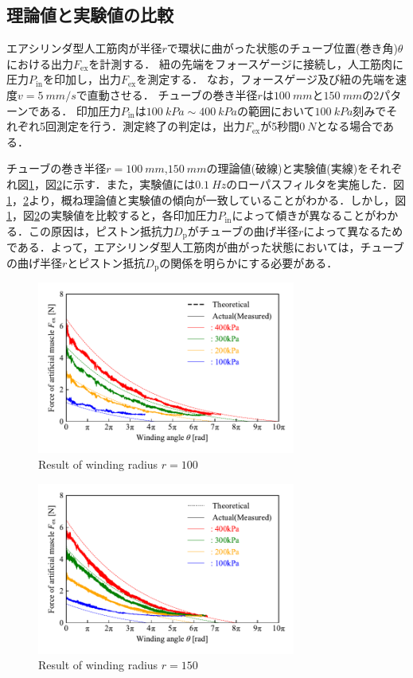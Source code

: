 \subsection{理論値と実験値の比較}%
エアシリンダ型人工筋肉が半径$r$で環状に曲がった状態のチューブ位置(巻き角)$\theta$における出力$F_\mathrm{ex}$を計測する．
紐の先端をフォースゲージに接続し，人工筋肉に圧力$P_\mathrm{in}$を印加し，出力$F_\mathrm{ex}$を測定する．
なお，フォースゲージ及び紐の先端を速度$v=\SI{5}{mm/s}$で直動させる．
チューブの巻き半径$r$は$\SI{100}{mm}$と$\SI{150}{mm}$の2パターンである．
印加圧力$P_\mathrm{in}$は$\SI{100}{kPa} \sim \SI{400}{kPa}$の範囲において$\SI{100}{kPa}$刻みでそれぞれ5回測定を行う．測定終了の判定は，出力$F_\mathrm{ex}$が5秒間$\SI{0}{N}$となる場合である．
\par
チューブの巻き半径$r=\SI{100}{mm}$,$\SI{150}{mm}$の理論値(破線)と実験値(実線)をそれぞれ図\ref{r=100mm}，図\ref{r=150mm}に示す．また，実験値には$\SI{0.1}{Hz}$のローパスフィルタを実施した．図\ref{r=100mm}，\ref{r=150mm}より，概ね理論値と実験値の傾向が一致していることがわかる．しかし，図\ref{r=100mm}，図\ref{r=150mm}の実験値を比較すると，各印加圧力$P_\mathrm{in}$によって傾きが異なることがわかる．この原因は，ピストン抵抗力$D_\mathrm{p}$がチューブの曲げ半径$r$によって異なるためである．よって，エアシリンダ型人工筋肉が曲がった状態においては，チューブの曲げ半径$r$とピストン抵抗$D_\mathrm{p}$の関係を明らかにする必要がある．
\begin{figure}[t]
  \centering
  \includegraphics[width=85mm]{_pdf/result_100mm.pdf}
  \caption{Result of winding radius $r=100$}
  \label{r=100mm}
\end{figure}

\begin{figure}[t]
  \centering
  \includegraphics[width=85mm]{_pdf/result_150mm.pdf}
  \caption{Result of winding radius $r=150$}
  \label{r=150mm}
\end{figure}

